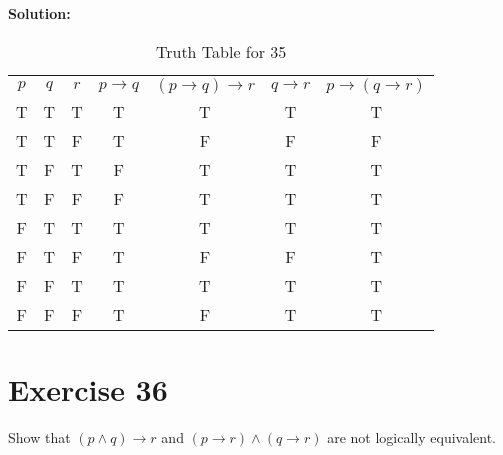 \documentclass{Axon}
\begin{document}
\noindent
\textbf{Solution:}
\begin{table}[ht]
    \centering
    \begin{tabular}{c|c|c|c|c|c|c}
        \(p\) & \(q\) & \(r\) & \(p \to q\) & \((p \to q) \to r\) & \(q \to r\) & \(p \to (q \to r)\) \\
        T     & T     & T     & T           & T                   & T           & T                   \\
        T     & T     & F     & T           & F                   & F           & F                   \\
        T     & F     & T     & F           & T                   & T           & T                   \\
        T     & F     & F     & F           & T                   & T           & T                   \\
        F     & T     & T     & T           & T                   & T           & T                   \\
        F     & T     & F     & T           & F                   & F           & T                   \\
        F     & F     & T     & T           & T                   & T           & T                   \\
        F     & F     & F     & T           & F                   & T           & T
    \end{tabular}
    \caption{Truth Table for 35}
\end{table}

\section*{Exercise 36}
Show that \((p \land q) \to r\) and \((p \to r) \land (q \to r)\) are not logically equivalent.
\end{document}
